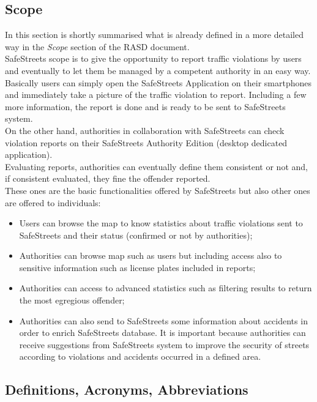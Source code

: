 \documentclass{article}
\begin{document}
		\subsection{Scope}
		In this section is shortly summarised what is already defined in a more detailed way in the \textit{Scope} section of the RASD document.\\
		SafeStreets scope is to give the opportunity to report traffic violations by users and eventually to let them be managed by a competent authority in an easy way. Basically users can simply open the SafeStreets Application on their smartphones and immediately take a picture of the traffic violation to report. Including a few more information, the report is done and is ready to be sent to SafeStreets system.\\
		On the other hand, authorities in collaboration with SafeStreets can check violation reports on their SafeStreets Authority Edition (desktop dedicated application).\\
		Evaluating reports, authorities can eventually define them consistent or not and, if consistent evaluated, they fine the offender reported.\\
		These ones are the basic functionalities offered by SafeStreets but also other ones are offered to individuals:
		\begin{itemize}
			\item Users can browse the map to know statistics about traffic violations sent to SafeStreets and their status (confirmed or not by authorities);
			\item Authorities can browse map such as users but including access also to sensitive information such as license plates included in reports;
			\item Authorities can access to advanced statistics such as filtering results to return the most egregious offender;
			\item Authorities can also send to SafeStreets some information about accidents in order to enrich SafeStreets database. It is important because authorities can receive suggestions from SafeStreets system to improve the security of streets according to violations and accidents occurred in a defined area.
		\end{itemize}
		\subsection{Definitions, Acronyms, Abbreviations}
\end{document}

